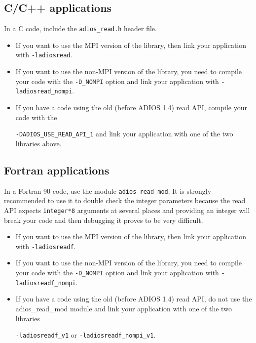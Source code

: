 \subsection{C/C++ applications}

In a C code, include the \verb+adios_read.h+ header file.  

\begin{itemize}
\item If you want to use the MPI version of the library, then link your application with \verb+-ladiosread+.

\item If you want to use the non-MPI version of the library, you need to compile your 
code with the \verb+-D_NOMPI+ option and link your application with \verb+-ladiosread_nompi+.

\item If you have a code using the old (before ADIOS 1.4) read API, compile your code with the

\verb+-DADIOS_USE_READ_API_1+ and link your application with one of the two libraries above.

\end{itemize}

\subsection{Fortran applications}

In a Fortran 90 code,  use the module 
\verb+adios_read_mod+. It is strongly recommended to use it to double check the integer 
parameters because the read API expects \verb+integer*8+ arguments 
at several places and providing an integer will break your code and then debugging 
it proves to be very difficult.

\begin{itemize}
\item If you want to use the MPI version of the library, then link your  application with \verb+-ladiosreadf+.

\item If you want to use the non-MPI version of the library, you need to compile your 
code with the \verb+-D_NOMPI+ option and link your application with \verb+-ladiosreadf_nompi+.

\item If you have a code using the old (before ADIOS 1.4) read API,  
do not use the adios\_read\_mod module and link your application 
with one of the two libraries 

\verb+-ladiosreadf_v1+ or \verb+-ladiosreadf_nompi_v1+.

\end{itemize}




